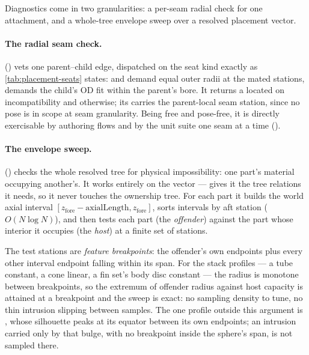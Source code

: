 Diagnostics come in two granularities: a per-seam radial check for one attachment, and a whole-tree
envelope sweep over a resolved placement vector.

\paragraph{The radial seam check.}
 () vets one parent--child edge,
dispatched on the seat kind exactly as \cref{tab:placement-seats} states:  and
 demand equal outer radii at the mated stations,  demands the
child's OD fit within the parent's bore. It returns a located  on
incompatibility and  otherwise; its  carries the parent-local seam
station, since no pose is in scope at seam granularity. Being free and pose-free, it is directly
exercisable by authoring flows and by the unit suite one seam at a time
().

\paragraph{The envelope sweep.}
 () checks the whole resolved tree for
physical impossibility: one part's material occupying another's. It works entirely on the
 vector ---  gives it the tree relations it needs, so it never touches
the ownership tree. For each part it builds the world axial interval
$[z_{\mathrm{fore}} - \mathrm{axialLength}, z_{\mathrm{fore}}]$, sorts intervals by aft station
($O(N \log N)$), and then tests each part (the \emph{offender}) against the part whose interior it
occupies (the \emph{host}) at a finite set of stations.

\begin{keyinsight}
The test stations are \emph{feature breakpoints}: the offender's own endpoints plus every other
interval endpoint falling within its span. For the stack profiles --- a tube constant, a cone
linear, a fin set's body disc constant --- the radius is monotone between breakpoints, so the
extremum of offender radius against host capacity is attained at a breakpoint and the sweep is
exact: no sampling density to tune, no thin intrusion slipping between samples. The one profile
outside this argument is , whose silhouette peaks at its equator between its
own endpoints; an intrusion carried only by that bulge, with no breakpoint inside the sphere's
span, is not sampled there.
\end{keyinsight}

